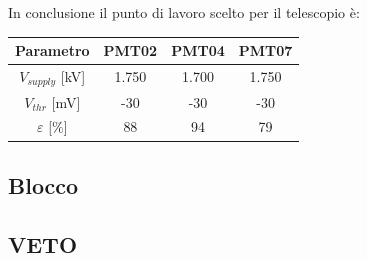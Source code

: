 \documentclass[10pt,a4paper]{article}
\begin{document}
\vspace{1cm}

In conclusione il punto di lavoro scelto per il telescopio è:

\vspace{1cm}

\begin{tabular}{|c|c|c|c|}
\toprule
Parametro & PMT02 & PMT04 & PMT07 \\
\midrule
$V_{supply}$ [kV] & 1.750 & 1.700 & 1.750  \\
$V_{thr}$ [mV] & -30 & -30 & -30  \\
$\varepsilon$ [$\%$] & 88 & 94 & 79 \\
\bottomrule
\end{tabular}

\subsection{Blocco}

\subsection{VETO}
\end{document}
